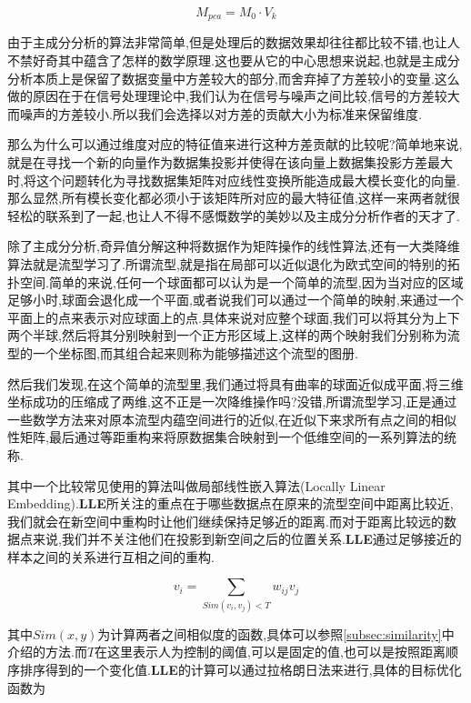\begin{equation}
	M_{pca} = M_0 \cdot V_k 
\end{equation}

由于主成分分析的算法非常简单,但是处理后的数据效果却往往都比较不错,也让人不禁好奇其中蕴含了怎样的数学原理.这也要从它的中心思想来说起,也就是主成分分析本质上是保留了数据变量中方差较大的部分,而舍弃掉了方差较小的变量.这么做的原因在于在信号处理理论中,我们认为在信号与噪声之间比较,信号的方差较大而噪声的方差较小.所以我们会选择以对方差的贡献大小为标准来保留维度.

那么为什么可以通过维度对应的特征值来进行这种方差贡献的比较呢?简单地来说,就是在寻找一个新的向量作为数据集投影并使得在该向量上数据集投影方差最大时,将这个问题转化为寻找数据集矩阵对应线性变换所能造成最大模长变化的向量.那么显然,所有模长变化都必须小于该矩阵所对应的最大特征值,这样一来两者就很轻松的联系到了一起,也让人不得不感慨数学的美妙以及主成分分析作者的天才了.

除了主成分分析,奇异值分解这种将数据作为矩阵操作的线性算法,还有一大类降维算法就是流型学习了.所谓流型,就是指在局部可以近似退化为欧式空间的特别的拓扑空间.简单的来说,任何一个球面都可以认为是一个简单的流型,因为当对应的区域足够小时,球面会退化成一个平面,或者说我们可以通过一个简单的映射,来通过一个平面上的点来表示对应球面上的点.具体来说对应整个球面,我们可以将其分为上下两个半球,然后将其分别映射到一个正方形区域上,这样的两个映射我们分别称为流型的一个坐标图,而其组合起来则称为能够描述这个流型的图册.

然后我们发现,在这个简单的流型里,我们通过将具有曲率的球面近似成平面,将三维坐标成功的压缩成了两维,这不正是一次降维操作吗?没错,所谓流型学习,正是通过一些数学方法来对原本流型内蕴空间进行的近似,在近似下来求所有点之间的相似性矩阵,最后通过等距重构来将原数据集合映射到一个低维空间的一系列算法的统称.

其中一个比较常见使用的算法叫做局部线性嵌入算法(Locally Linear Embedding).\textbf{LLE}所关注的重点在于哪些数据点在原来的流型空间中距离比较近,我们就会在新空间中重构时让他们继续保持足够近的距离.而对于距离比较远的数据点来说,我们并不关注他们在投影到新空间之后的位置关系.\textbf{LLE}通过足够接近的样本之间的关系进行互相之间的重构.

\begin{equation}
	v_i = \sum_{Sim(v_i,v_j) < T} w_{ij}v_j
\end{equation}

其中$Sim(x,y)$为计算两者之间相似度的函数,具体可以参照\ref{subsec:similarity}中介绍的方法.而$T$在这里表示人为控制的阈值,可以是固定的值,也可以是按照距离顺序排序得到的一个变化值.\textbf{LLE}的计算可以通过拉格朗日法来进行,具体的目标优化函数为


